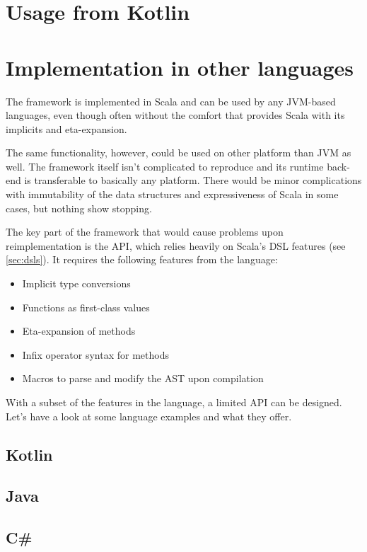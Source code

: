 \section{Usage from Kotlin}


\section{Implementation in other languages}

The framework is implemented in Scala and can be used by any JVM-based languages, even though often without the comfort that provides Scala with its implicits and eta-expansion.

The same functionality, however, could be used on other platform than JVM as well. The framework itself isn't complicated to reproduce and its runtime back-end is transferable to basically any platform. There would be minor complications with immutability of the data structures and expressiveness of Scala in some cases, but nothing show stopping.

The key part of the framework that would cause problems upon reimplementation is the API, which relies heavily on Scala's DSL features (see \ref{sec:dsls}). It requires the following features from the language:

\begin{itemize}
	\item Implicit type conversions
	\item Functions as first-class values
	\item Eta-expansion of methods
	\item Infix operator syntax for methods
	\item Macros to parse and modify the AST upon compilation
\end{itemize}

With a subset of the features in the language, a limited API can be designed. Let's have a look at some language examples and what they offer.

\subsection{Kotlin}

\subsection{Java}

\subsection{C\#}

